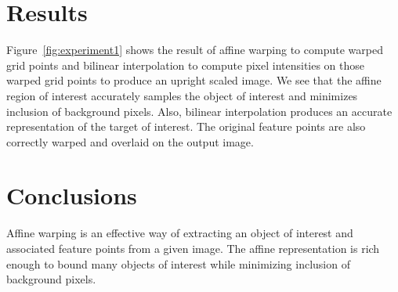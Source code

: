 \section{Results}
Figure~\ref{fig:experiment1} shows the result of affine warping to compute warped grid points and bilinear interpolation to compute pixel intensities on those warped grid points to produce an upright scaled image.  We see that the affine region of interest accurately samples the object of interest and minimizes inclusion of background pixels.  Also, bilinear interpolation produces an accurate representation of the target of interest.  The original feature points are also correctly warped and overlaid on the output image.

\section{Conclusions}
Affine warping is an effective way of extracting an object of interest and associated feature points from a given image.  The affine representation is rich enough to bound many objects of interest while minimizing inclusion of background pixels.




